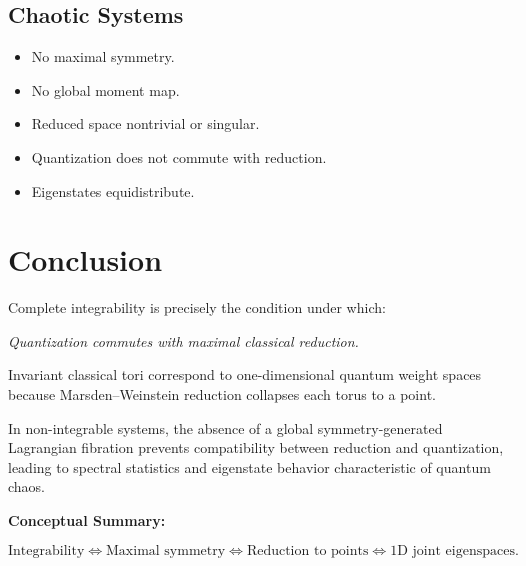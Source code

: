 \documentclass[11pt]{article}
\begin{document}
\subsection*{Chaotic Systems}

\begin{itemize}
\item No maximal symmetry.
\item No global moment map.
\item Reduced space nontrivial or singular.
\item Quantization does not commute with reduction.
\item Eigenstates equidistribute.
\end{itemize}

\section{Conclusion}

Complete integrability is precisely the condition under which:

\begin{center}
\emph{Quantization commutes with maximal classical reduction.}
\end{center}

Invariant classical tori correspond to one-dimensional quantum weight spaces because Marsden--Weinstein reduction collapses each torus to a point.

In non-integrable systems, the absence of a global symmetry-generated Lagrangian fibration prevents compatibility between reduction and quantization, leading to spectral statistics and eigenstate behavior characteristic of quantum chaos.

\bigskip

\noindent
\textbf{Conceptual Summary:}

\[
\boxed{
\text{Integrability} \Longleftrightarrow
\text{Maximal symmetry} \Longleftrightarrow
\text{Reduction to points} \Longleftrightarrow
\text{1D joint eigenspaces}.
}
\]
\end{document}
